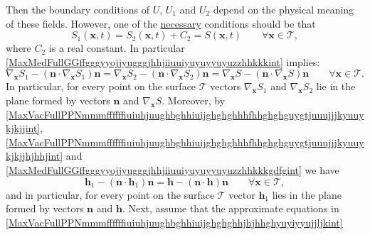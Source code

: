 \documentclass{article}
\theoremstyle{definition}
\theoremstyle{remark}
\renewcommand{\vec}[1]{\mathbf{#1}}
\newcommand{\er}{\eqref}
\newcommand{\er}{\eqref}
\begin{document}
Then the boundary conditions of $U$, $U_1$ and $U_2$ depend on the
physical meaning of these fields. However, one of the
\underline{necessary} conditions should be that
\begin{equation}\label{MaxMedFullGGffgggyyojjyugggjhhjiiuuiyuyuyyuyuzzhhkkkint}
S_1(\vec x,t)=S_2(\vec x,t)+C_2=S(\vec x,t)\quad\quad\forall\vec
x\in\mathcal{T},
\end{equation}
where $C_2$ is a real constant. In particular
\er{MaxMedFullGGffgggyyojjyugggjhhjiiuuiyuyuyyuyuzzhhkkkint}
implies:
%
%
%
\begin{equation}\label{MaxMedFullGGffgggyyojjyugggjhhjiiuuiyuyuyyuyuzzhhkkkgdfgint}
\nabla_{\vec x} S_1-\left(\vec n\cdot \nabla_{\vec x} S_1\right)\vec
n
=\nabla_{\vec x} S_2-\left(\vec n\cdot \nabla_{\vec x}
S_2\right)\vec n=\nabla_{\vec x} S-\left(\vec n\cdot \nabla_{\vec x}
S\right)\vec n\quad\quad\forall\vec x\in\mathcal{T}.
\end{equation}
In particular, for every point on the surface $\mathcal{T}$ vectors
$\nabla_{\vec x} S_1$ and $\nabla_{\vec x} S_2$ lie in the plane
formed by vectors $\vec n$ and $\nabla_{\vec x} S$. Moreover, by
\er{MaxVacFullPPNmmmffffffiuiuhjuughbghhiuijghghghhhfhhghghguygtjuuujjjkyuuykjkjjint},
\er{MaxVacFullPPNmmmffffffiuiuhjuughbghhiuijghghghhhfhhghghguygtjuuujjjkyuuykjkjjhjhhjint}
and \er{MaxMedFullGGffgggyyojjyugggjhhjiiuuiyuyuyyuyuzzhhkkkgdfgint}
we have
%
%
%
\begin{equation}\label{MaxMedFullGGffgggyyojjyugggjhhjiiuuiyuyuyyuyuzzhhkkkgdfghgghghint}
\vec h_1-\left(\vec n\cdot \vec h_1\right)\vec n=\vec h-\left(\vec
n\cdot \vec h\right)\vec n\quad\quad\forall\vec x\in\mathcal{T},
\end{equation}
and in particular, for every point on the surface $\mathcal{T}$
vector $\vec h_1$ lies in the plane formed by vectors $\vec n$ and
$\vec h$.
Next, assume that the approximate equations in
\er{MaxVacFullPPNmmmffffffiuiuhjuughbghhiuijghghghhjhjhhghyuyiyyujjljkint}
\end{document}
